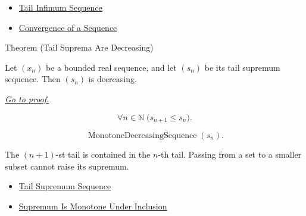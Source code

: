 \begin{remark*}[Dependencies]\hfill
\begin{itemize}
  \item \hyperref[def:tail-infimum-sequence]{Tail Infimum Sequence}
  \item \hyperref[def:convergent-sequence]{Convergence of a Sequence}
\end{itemize}
\end{remark*}


\begin{theorembox}{Theorem (Tail Suprema Are Decreasing)}
\begin{theorem}
\label{thm:tail-suprema-are-decreasing}
Let $(x_n)$ be a bounded real sequence, and let $(s_n)$ be its tail
supremum sequence. Then $(s_n)$ is decreasing.

\smallskip
\noindent
\hyperref[prf:tail-suprema-are-decreasing]{\textit{Go to proof.}}
\end{theorem}
\end{theorembox}

\begin{remark*}
\[
\forall n\in\mathbb{N}\;\bigl(s_{n+1}\le s_n\bigr).
\]
\end{remark*}

\begin{remark*}
\[
\operatorname{MonotoneDecreasingSequence}(s_n).
\]
\end{remark*}

\begin{remark*}[Interpretation]
The $(n+1)$-st tail is contained in the $n$-th tail. Passing from a set to a
smaller subset cannot raise its supremum.
\end{remark*}

\begin{remark*}[Dependencies]\hfill
\begin{itemize}
  \item \hyperref[def:tail-supremum-sequence]{Tail Supremum Sequence}
  \item \hyperref[thm:supremum-is-monotone-under-inclusion]{Supremum Is Monotone Under Inclusion}
\end{itemize}
\end{remark*}

